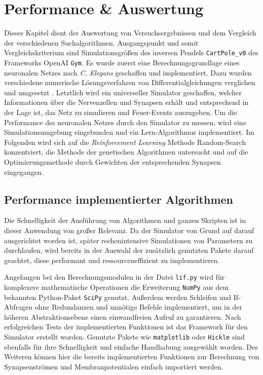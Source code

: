%
\chapter{Performance \& Auswertung}
\label{chap:erg}
%
	Dieses Kapitel dient der Auswertung von Versuchsergebnissen und dem Vergleich der verschiedenen Suchalgorithmen. Ausgangspunkt und somit Vergleichskriterium sind Simulationsgrößen des inversen Pendels \texttt{CartPole\_v0} des Frameworks OpenAI \texttt{Gym}.	Es wurde zuerst eine Berechnungsgrundlage eines neuronalen Netzes nach \textit{C. Elegans} \cite{CElegans} geschaffen und implementiert. Dazu wurden verschiedene numerische Lösungsverfahren von Differentialgleichungen verglichen und umgesetzt \cite{NonlinearDynamics}. Letztlich wird ein universeller Simulator geschaffen, welcher Informationen über die Nervenzellen und Synapsen erhält und entsprechend in der Lage ist, das Netz zu simulieren und Feuer-Events auszugeben. Um die Performance des neuronalen Netzes durch den Simulator zu messen, wird eine Simulationsumgebung eingebunden und ein Lern-Algorithmus implementiert. Im Folgenden wird sich auf die \textit{Reinforcement Learning} Methode Random-Search konzentriert, die Methode der genetischen Algorithmen untersucht und auf die Optimierungsmethode durch Gewichten der entsprechenden Synapsen eingegangen.

\section{Performance implementierter Algorithmen}
\label{sec:erg_performance}
	Die Schnelligkeit der Ausführung von Algorithmen und ganzen Skripten ist in dieser Anwendung von großer Relevanz. Da der Simulator von Grund auf darauf ausgerichtet worden ist, später rechenintensive Simulationen von Parametern zu durchlaufen, wird bereits in der Auswahl der zusätzlich genutzten Pakete darauf geachtet, diese performant und ressourceneffizient zu implementieren.
	
	Angefangen bei den Berechnungsmodulen in der Datei \texttt{lif.py} wird für komplexere mathematische Operationen die Erweiterung \texttt{NumPy} \cite{NumPy} aus dem bekannten Python-Paket \texttt{SciPy} \cite{NumPy} genutzt. Außerdem werden Schleifen und If-Abfragen ohne Redundanzen und unnötige Befehle implementiert, um in der höheren Abstraktionsebene einen einwandfreien Aufruf zu garantieren. Nach erfolgreichen Tests der implementierten Funktionen ist das Framework für den Simulator erstellt worden. Genutzte Pakete wie \texttt{matplotlib} \cite{Hunter2007} oder \texttt{Hickle} \cite{hdf5} sind ebenfalls für ihre Schnelligkeit und einfache Handhabung ausgewählt worden. Des Weiteren können hier die bereits implementierten Funktionen zur Berechnung von Synapsenströmen und Membranpotentialen einfach importiert werden.
	
